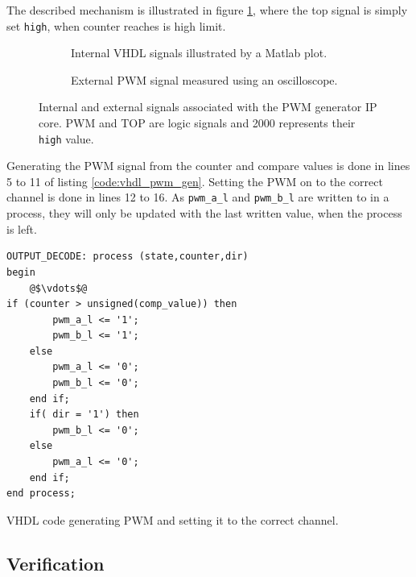 The described mechanism is illustrated in figure \ref{sfig:pwm_gen_int}, where the top signal is simply set \texttt{high}, when counter reaches is high limit.

\begin{figure}
    \centering
    \begin{subfigure}[b]{0.45\textwidth}
        
        \caption{Internal VHDL signals illustrated by a Matlab plot.}
        \label{sfig:pwm_gen_int}
    \end{subfigure}
    \begin{subfigure}[b]{0.45\textwidth}
        
        \caption{External PWM signal measured using an oscilloscope. }
        \label{sfig:pwm_gen_ext}
    \end{subfigure}
    \caption[Signals associated with the PWM generator IP core]{Internal and external signals associated with the PWM generator IP core. PWM and TOP are logic signals and 2000 represents their \texttt{high} value.}
    \label{fig:vhdl_pwm_gen}
\end{figure}

Generating the PWM signal from the counter and compare values is done in lines 5 to 11 of listing \ref{code:vhdl_pwm_gen}.
Setting the PWM on to the correct channel is done in lines 12 to 16.
As \texttt{pwm\_a\_l} and \texttt{pwm\_b\_l} are written to in a process, they will only be updated with the last written value, when the process is left.

\begin{listing}[h]
\begin{verbatim}
OUTPUT_DECODE: process (state,counter,dir)
begin
	@$\vdots$@
if (counter > unsigned(comp_value)) then
		pwm_a_l <= '1';
		pwm_b_l <= '1';
	else
		pwm_a_l <= '0';
		pwm_b_l <= '0';
	end if;	
	if( dir = '1') then 
		pwm_b_l <= '0';
	else 
		pwm_a_l <= '0';	
	end if;
end process;		
\end{verbatim}
\caption[VHDL code generating PWM signals.]{VHDL code generating PWM and setting it to the correct channel.}
\label{code:vhdl_pwm_gen}
\end{listing}

	

\subsection{Verification} %
\label{sub:verification}
